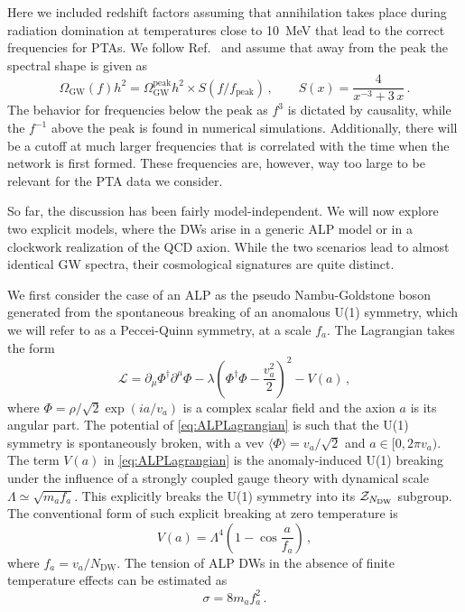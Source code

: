 \documentclass{article}
\begin{document}
Here we included redshift factors assuming that annihilation takes place during radiation domination at temperatures close to \SI{10}{\MeV} that lead to the correct frequencies for PTAs.
We follow Ref.~\cite{Ferreira:2022zzo} and assume that away from the peak the spectral shape is given as
\begin{equation}
    \Omega_\mathrm{GW}(f)h^2 = 
    \Omega_\mathrm{GW}^\mathrm{peak}h^2\times S(f/f_{\mathrm{peak}})\,,
    \qquad 
    S(x) = \frac{4}{x^{-3} + 3 \, x}\,.
\end{equation}
The behavior for frequencies below the peak as $f^3$ is dictated by causality, while the $f^{-1}$ above the peak is found in numerical simulations. Additionally, there will be a cutoff at much larger frequencies that is correlated with the time when the network is first formed. These frequencies are, however, way too large to be relevant for the PTA data we consider.


\bigskip 

So far, the discussion has been fairly model-independent. We will now explore two explicit models, where the DWs arise in a generic ALP model or in a clockwork realization of the QCD axion. While the two scenarios lead to almost identical GW spectra, their cosmological signatures are quite distinct. 

We first consider the case of an ALP as the pseudo Nambu-Goldstone boson generated from the spontaneous breaking of an anomalous U(1) symmetry, which we will refer to as a Peccei-Quinn symmetry, at a scale $f_a$. 
The Lagrangian takes the form
\begin{equation}\label{eq:ALPLagrangian}
    \mathcal{L}= \partial_{\mu}\Phi^{\dagger}\partial^{\mu}\Phi - \lambda\left(\Phi^{\dagger}\Phi - \frac{v_{a}^2}{2} \right)^{2} -V(a)\,, 
\end{equation}
where $\Phi = \rho/\sqrt{2} \exp{(i a/v_{a})}$ is a complex scalar field and the axion $a$ is its angular part. The potential of \cref{eq:ALPLagrangian} is such that
the U(1) symmetry is spontaneously broken, with a vev $\langle\Phi\rangle = v_a/\sqrt{2}$ and $a\in [0,2\pi v_{a})$. The term $V(a)$ in \cref{eq:ALPLagrangian} is the anomaly-induced U(1) breaking under the influence of a strongly coupled gauge theory with dynamical scale $\Lambda \simeq \sqrt{m_{a} f_{a}}$.
This explicitly breaks the U(1) symmetry into its $\mathcal{Z}_{N_{\rm DW}}$ subgroup.
The conventional form of such explicit breaking at zero temperature is
\begin{equation}
    V(a) = \Lambda^{4}\left(1-\cos{\frac{a}{f_{a}}} \right)\,,
\end{equation}
where $f_{a} = v_{a}/N_\mathrm{DW}$. 
The tension of ALP DWs in the absence of finite temperature effects can be estimated as~\cite{Saikawa:2017hiv}
\begin{equation}
    \label{eq:DW_ALP_wall_tension}
    \sigma= 8 m_{a} f_{a}^2\,.
\end{equation}
\end{document}
